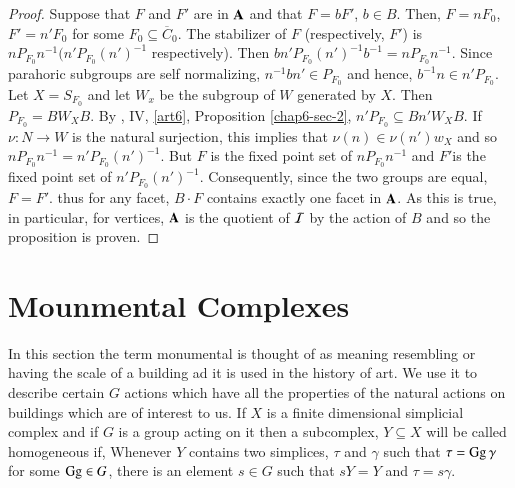 \begin{proof}
Suppose that $F$ and $F'$ are in $\mathbf{A}$ and that $F=bF'$, $b \in B$. Then, $F= n F_{0}$, $F' =n'F_{0}$ for some $F_{0} \subseteq \overline{C}_{0}$. The stabilizer of $F$ (respectively, $F'$) is $nP_{F_{0}}n^{-1}(n'P_{F_{0}}(n')^{-1}$ respectively). Then $bn'P_{F_{0}}(n')^{-1}b^{-1} =nP_{F_{0}}n^{-1}$. Since parahoric subgroups are self normalizing, $n^{-1}bn' \in P_{F_{0}}$ and hence, $b^{-1}n \in n'P_{F_{0}}$. Let $X = S_{F_{0}}$ and let $W_{x}$ be the subgroup of $W$ generated by $X$. Then $P_{F_{0}} = BW_{X}B$. By \cite{chap6-NB I}, IV, \ref{art6}, Proposition \ref{chap6-sec-2}, $n'P_{F_{0}} \subseteq Bn'W_{X}B$. If $\nu : N \rightarrow W$ is the natural surjection, this implies that $\nu(n) \in \nu(n')w_{X}$ and so $nP_{F_{0}}n^{-1} = n'P_{F_{0}}(n')^{-1}$. But $F$ is the fixed point set of $nP_{F_{0}}n^{-1}$ and $F'$\pageoriginale is the fixed point set of $n'P_{F_{0}}(n')^{-1}$. Consequently, since the two groups are equal, $F =F'$. thus for any facet, $B \cdot F$ contains exactly one facet in $\mathbf{A}$. As this is true, in particular, for vertices, $\mathbf{A}$ is the quotient of $\mathcal{I}$ by the action of $B$ and so the proposition is proven.  
\end{proof}

\section{Mounmental Complexes}\label{chap6-sec-11}

In this section the term monumental is thought of as meaning resembling or having the scale of a building ad it is used in the history of art. We use it to describe certain $G$ actions which have all the properties of the natural actions on buildings which are of interest to us. If $X$ is a finite dimensional simplicial complex and if $G$ is a group acting on it then a subcomplex, $Y \subseteq X$ will be  called homogeneous if, Whenever $Y$ contains two simplices, $\tau$ and $\gamma$ such that $\tau = \operatorname{Gg} \gamma$ for some $\operatorname{Gg} \in G$, there is an element $s\in G$ such that $sY = Y$ and $\tau = s \gamma$.

